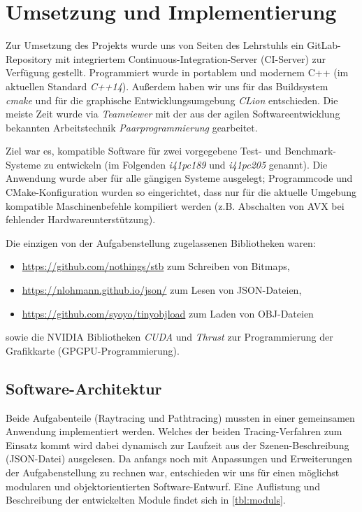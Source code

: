 
\chapter{Umsetzung und Implementierung}
\label{ch:implementierung}

Zur Umsetzung des Projekts wurde uns von Seiten des Lehrstuhls ein GitLab-Repository mit integriertem Continuous-Integration-Server (CI-Server) zur Verfügung gestellt. Programmiert wurde in portablem und modernem C++ (im aktuellen Standard \textit{C++14}).  Außerdem haben wir uns für das Buildsystem \textit{cmake} und für die graphische Entwicklungsumgebung \textit{CLion} entschieden. Die meiste Zeit wurde via \textit{Teamviewer} mit der aus der agilen Softwareentwicklung bekannten Arbeitstechnik \textit{Paarprogrammierung} gearbeitet.

Ziel war es, kompatible Software für zwei vorgegebene Test- und Benchmark-Systeme zu entwickeln (im Folgenden \textit{i41pc189} und \textit{i41pc205} genannt). Die Anwendung wurde aber für alle gängigen Systeme ausgelegt; Programmcode und CMake-Konfiguration wurden so eingerichtet, dass nur für die aktuelle Umgebung kompatible Maschinenbefehle kompiliert werden (z.B. Abschalten von AVX bei fehlender Hardwareunterstützung).

Die einzigen von der Aufgabenstellung zugelassenen Bibliotheken waren:
\begin{itemize}[noitemsep,topsep=0pt,parsep=0pt,partopsep=0pt]
\item \url{https://github.com/nothings/stb} zum Schreiben von Bitmaps,
\item \url{https://nlohmann.github.io/json/} zum Lesen von JSON-Dateien,
\item \url{https://github.com/syoyo/tinyobjload} zum Laden von OBJ-Dateien
\end{itemize}
sowie die NVIDIA Bibliotheken \textit{CUDA} und \textit{Thrust} zur Programmierung der Grafikkarte (GPGPU-Programmierung).

\section{Software-Architektur}
Beide Aufgabenteile (Raytracing und Pathtracing) mussten in einer gemeinsamen Anwendung implementiert werden. Welches der beiden Tracing-Verfahren zum Einsatz kommt wird dabei dynamisch zur Laufzeit aus der Szenen-Beschreibung (JSON-Datei) ausgelesen. Da anfangs noch mit Anpassungen und Erweiterungen der Aufgabenstellung zu rechnen war, entschieden wir uns für einen möglichst modularen und objektorientierten Software-Entwurf. Eine Auflistung und Beschreibung der entwickelten Module findet sich in \autoref{tbl:moduls}. 

